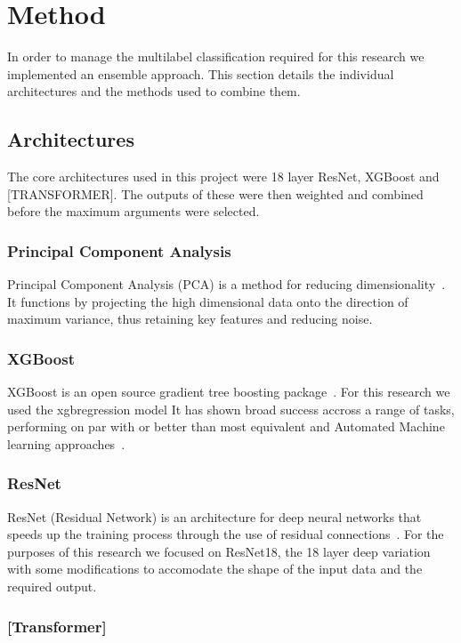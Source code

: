 \clearpage  %

\section{Method}

In order to manage the multilabel classification required for this research we implemented an ensemble approach. 
This section details the individual architectures and the methods used to combine them.

\subsection{Architectures}

The core architectures used in this project were 18 layer ResNet, XGBoost and [TRANSFORMER]. The outputs of these were 
then weighted and combined before the maximum arguments were selected.

\subsubsection{Principal Component Analysis}
Principal Component Analysis (PCA) is a method for reducing dimensionality~\cite{pcapaper}. It functions by projecting the high dimensional data onto the direction of maximum variance, thus retaining key features and reducing noise.



\subsubsection{XGBoost}
XGBoost is an open source gradient tree boosting package~\cite{xgboost}. 
For this research we used the xgbregression model It has shown broad success accross a range of tasks, performing on par with or better than most equivalent and Automated Machine learning approaches~\cite{xgbcomp}.
\subsubsection{ResNet}
ResNet (Residual Network) is an architecture for deep neural networks that speeds up the training process through the use of residual connections~\cite{resnet}. 
For the purposes of this research we focused on ResNet18, the 18 layer deep variation with some modifications to accomodate the shape of the input data and the required output. 
\subsubsection{[Transformer]}

